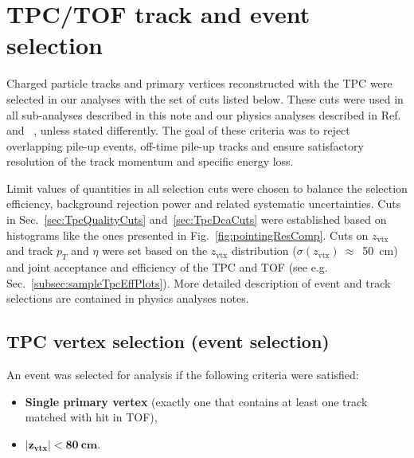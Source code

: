 

\chapter{TPC/TOF track and event selection}\label{chap:TpcTrackQualityCuts}

Charged particle tracks and primary vertices reconstructed with the TPC were selected in our analyses with the set of cuts listed below. These cuts were used in all sub-analyses described in this note and our physics analyses described in Ref.~\cite{AnalysisNoteRafal} and ~\cite{AnalysisNoteLukasz}, unless stated differently. The goal of these criteria was to reject overlapping pile-up events, off-time pile-up tracks and ensure satisfactory resolution of the track momentum and specific energy loss.

Limit values of quantities in all selection cuts were chosen to balance the selection efficiency, background rejection power and related systematic uncertainties. Cuts in Sec.~\ref{sec:TpcQualityCuts} and~\ref{sec:TpcDcaCuts} were established based on histograms like the ones presented in Fig.~\ref{fig:pointingResComp}. Cuts on $z_{\text{vtx}}$ and track $p_{T}$ and $\eta$ were set based on the $z_{\text{vtx}}$ distribution ($\sigma(z_{\text{vtx}})~\approx$~50~cm) and joint acceptance and efficiency of the TPC and TOF (see e.g. Sec.~\ref{subsec:sampleTpcEffPlots}). More detailed description of event and track selections are contained in physics analyses notes\cite{AnalysisNoteRafal,AnalysisNoteLukasz}.

\section{TPC vertex selection (event selection)}
An event was selected for analysis if the following criteria were satisfied:
\begin{itemize}
	\item \textbf{Single primary vertex} (exactly one that contains at least one track matched with hit in TOF),
	\item \textbf{$\bm{|z_{\text{vtx}}|<80~\text{cm}}$}.
\end{itemize}

